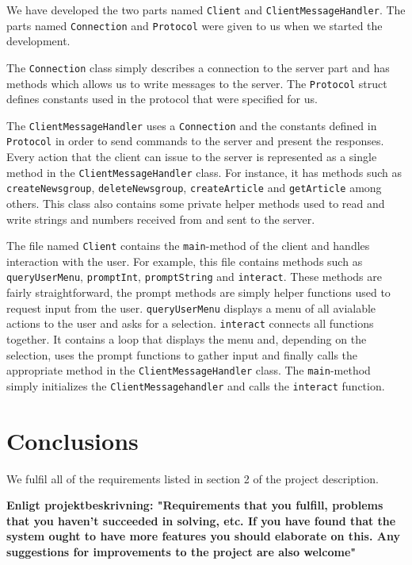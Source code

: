 \documentclass[a4paper]{article}
\begin{document}
We have developed the two parts named \texttt{Client} and \texttt{ClientMessageHandler}. The parts named \texttt{Connection} and \texttt{Protocol} were given to us when we started the development.

The \texttt{Connection} class simply describes a connection to the server part and has methods which allows us to write messages to the server. The \texttt{Protocol} struct defines constants used in the protocol that were specified for us.

The \texttt{ClientMessageHandler} uses a \texttt{Connection} and the constants defined in \texttt{Protocol} in order to send commands to the server and present the responses. Every action that the client can issue to the server is represented as a single method in the \texttt{ClientMessageHandler} class. For instance, it has methods such as \texttt{createNewsgroup}, \texttt{deleteNewsgroup}, \texttt{createArticle} and \texttt{getArticle} among others. This class also contains some private helper methods used to read and write strings and numbers received from and sent to the server.

The file named \texttt{Client} contains the \texttt{main}-method of the client and handles interaction with the user. For example, this file contains methods such as \texttt{queryUserMenu}, \texttt{promptInt}, \texttt{promptString} and \texttt{interact}. These methods are fairly straightforward, the prompt methods are simply helper functions used to request input from the user. \texttt{queryUserMenu} displays a menu of all avialable actions to the user and asks for a selection. \texttt{interact} connects all functions together. It contains a loop that displays the menu and, depending on the selection, uses the prompt functions to gather input and finally calls the appropriate method in the \texttt{ClientMessageHandler} class. The \texttt{main}-method simply initializes the \texttt{ClientMessagehandler} and calls the \texttt{interact} function.

\section{Conclusions}
We fulfil all of the requirements listed in section 2 of the project description.


\textbf{Enligt projektbeskrivning:
"Requirements that you fulfill, problems that you haven’t succeeded in solving,
etc. If you have found that the system ought to have more features you should elaborate on
this. Any suggestions for improvements to the project are also welcome"}
\end{document}
